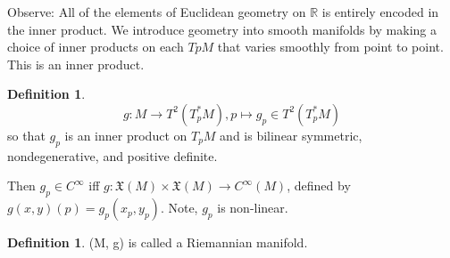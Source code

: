 \documentclass{article}
\theoremstyle{definition}
\newtheorem{defn}[theorem]{Definition}
\newenvironment{definition}
  {\vspace{8pt}\begin{mdframed}[backgroundcolor=blueish,innertopmargin=4]\begin{defn}}
  {\end{defn}\end{mdframed}\vspace{4pt}}
\begin{document}
Observe: All of the elements of Euclidean geometry on $\mathbb R$ is entirely encoded in the inner product. We introduce geometry into smooth manifolds by making a choice of inner products on each $TpM$ that varies smoothly from point to point. This is an inner product.

\begin{definition}

\[
    g: M \rightarrow T^2 (T^*_pM), p\mapsto g_p \in T^2 (T^*_pM)
\]
so that $g_p$ is an inner product on $T_pM$ and is bilinear symmetric, nondegenerative, and positive definite.

Then $g_p \in C^\infty$ iff $g: \mathfrak X(M) \times \mathfrak X(M) \rightarrow C^\infty(M)$, defined by  $g(x,y)(p )= g_p(x_p, y_p)$. Note, $g_p$ is non-linear.
\end{definition}

\begin{definition}

(M, g) is called a Riemannian manifold.
\end{definition}
\end{document}
